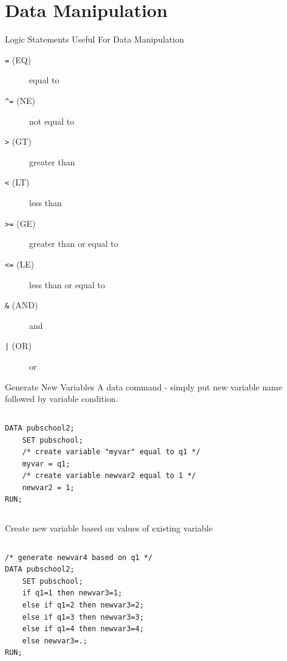 \documentclass[table,smaller]{beamer}
\begin{document}
\section{Data Manipulation}
\label{sec-5}

\begin{frame}[fragile,label=sec-5-1]{Logic Statements Useful For Data Manipulation}
 \begin{description}
\item[{\verb~=~ (EQ)}] equal to
\item[{\verb~^=~ (NE)}] not equal to
\item[{\verb~>~ (GT)}] greater than
\item[{\verb~<~ (LT)}] less than
\item[{\verb~>=~ (GE)}] greater than or equal to
\item[{\verb~<=~ (LE)}] less than or equal to
\item[{\verb~&~ (AND)}] and
\item[{\verb~|~ (OR)}] or
\end{description}
\end{frame}

\begin{frame}[fragile,label=sec-5-2]{Generate New Variables}
 A data command - simply put new variable name followed by variable condition.
\vspace{-.75em} \begin{columns}  \begin{block}{}
\begin{verbatim}
DATA pubschool2;
    SET pubschool;
    /* create variable "myvar" equal to q1 */
    myvar = q1;
    /* create variable newvar2 equal to 1 */
    newvar2 = 1;
RUN;
\end{verbatim}
\end{block} \end{columns} \vspace{.25em}

Create new variable based on values of existing variable

\vspace{-.75em} \begin{columns}  \begin{block}{}
\begin{verbatim}
/* generate newvar4 based on q1 */
DATA pubschool2;
    SET pubschool;
    if q1=1 then newvar3=1;
    else if q1=2 then newvar3=2;
    else if q1=3 then newvar3=3;
    else if q1=4 then newvar3=4;
    else newvar3=.;
RUN;
\end{verbatim}
\end{block} \end{columns} \vspace{.25em}
\end{frame}
\end{document}
